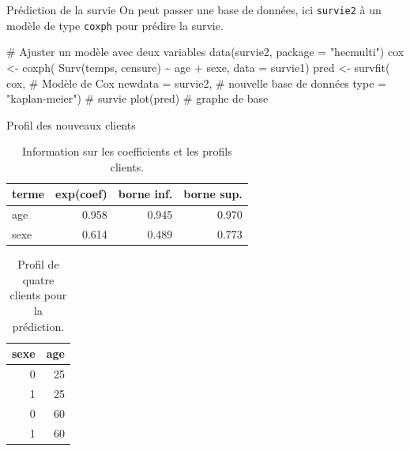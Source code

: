 \documentclass[
  ignorenonframetext,
]{beamer}
\newenvironment{Shaded}{\begin{snugshade}}{\end{snugshade}}
\newcommand{\AttributeTok}[1]{\textcolor[rgb]{0.40,0.45,0.13}{#1}}
\newcommand{\CommentTok}[1]{\textcolor[rgb]{0.37,0.37,0.37}{#1}}
\newcommand{\FunctionTok}[1]{\textcolor[rgb]{0.28,0.35,0.67}{#1}}
\newcommand{\NormalTok}[1]{\textcolor[rgb]{0.00,0.23,0.31}{#1}}
\newcommand{\OtherTok}[1]{\textcolor[rgb]{0.00,0.23,0.31}{#1}}
\newcommand{\SpecialCharTok}[1]{\textcolor[rgb]{0.37,0.37,0.37}{#1}}
\newcommand{\StringTok}[1]{\textcolor[rgb]{0.13,0.47,0.30}{#1}}
\begin{document}
\begin{frame}[fragile]{Prédiction de la survie}
\protect{}\label{pruxe9diction-de-la-survie}
On peut passer une base de données, ici \texttt{survie2} à un modèle de
type \texttt{coxph} pour prédire la survie.

\begin{Shaded}
\begin{Highlighting}[numbers=left,,]
\CommentTok{\# Ajuster un modèle avec deux variables}
\FunctionTok{data}\NormalTok{(survie2, }\AttributeTok{package =} \StringTok{"hecmulti"}\NormalTok{)}
\NormalTok{cox }\OtherTok{\textless{}{-}} \FunctionTok{coxph}\NormalTok{(}
  \FunctionTok{Surv}\NormalTok{(temps, censure) }\SpecialCharTok{\textasciitilde{}} 
\NormalTok{    age }\SpecialCharTok{+}\NormalTok{ sexe, }
  \AttributeTok{data =}\NormalTok{ survie1)}
\NormalTok{pred }\OtherTok{\textless{}{-}} \FunctionTok{survfit}\NormalTok{(}
\NormalTok{  cox,       }\CommentTok{\# Modèle de Cox}
  \AttributeTok{newdata =}\NormalTok{ survie2, }\CommentTok{\# nouvelle base de données}
  \AttributeTok{type =} \StringTok{"kaplan{-}meier"}\NormalTok{) }\CommentTok{\# survie}
\FunctionTok{plot}\NormalTok{(pred) }\CommentTok{\# graphe de base}
\end{Highlighting}
\end{Shaded}
\end{frame}

\begin{frame}{Profil des nouveaux clients}
\protect{}\label{profil-des-nouveaux-clients}
\begin{longtable}[t]{lrrr}

\caption{\label{tbl-survie-coefs}Information sur les coefficients et les
profils clients.}

\tabularnewline

\toprule
terme & exp(coef) & borne inf. & borne sup.\\
\midrule
age & 0.958 & 0.945 & 0.970\\
sexe & 0.614 & 0.489 & 0.773\\
\bottomrule

\end{longtable}

\begin{longtable}[t]{rr}

\caption{\label{tbl-profils}Profil de quatre clients pour la
prédiction.}

\tabularnewline

\toprule
sexe & age\\
\midrule
0 & 25\\
1 & 25\\
0 & 60\\
1 & 60\\
\bottomrule

\end{longtable}
\end{frame}
\end{document}
